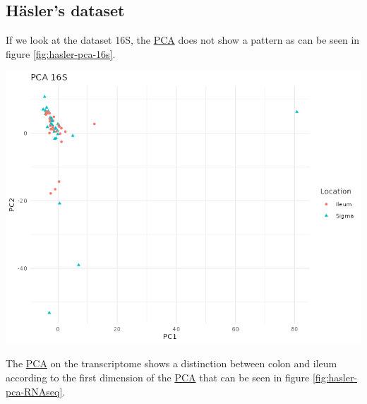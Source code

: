 \documentclass[
  12pt,
  a4paper,
  twoside,
  openright]{book}
\let\origfigure\figure
\let\endorigfigure\endfigure
\renewenvironment{figure}[1][2] {
    \expandafter\origfigure\expandafter[!htbp]
} {
    \endorigfigure
}
\begin{document}
\FloatBarrier

\hypertarget{results-hasler}{%
\subsection{Häsler's dataset}\label{results-hasler}}

If we look at the dataset 16S, the \protect\hyperlink{acronyms_PCA}{PCA} does not show a pattern as can be seen in figure \ref{fig:hasler-pca-16s}.

\begin{figure}
\includegraphics[width=1\linewidth]{images/hasler_PCA_16S} \caption[PCA of 16S of the Häsler dataset.]{PCA of 16S of Häsler dataset. There are some samples that are very different from the others. Each point represents a sample (colored and shaped by location).}\label{fig:hasler-pca-16s}
\end{figure}

The \protect\hyperlink{acronyms_PCA}{PCA} on the transcriptome shows a distinction between colon and ileum according to the first dimension of the \protect\hyperlink{acronyms_PCA}{PCA} that can be seen in figure \ref{fig:hasler-pca-RNAseq}.
\end{document}
